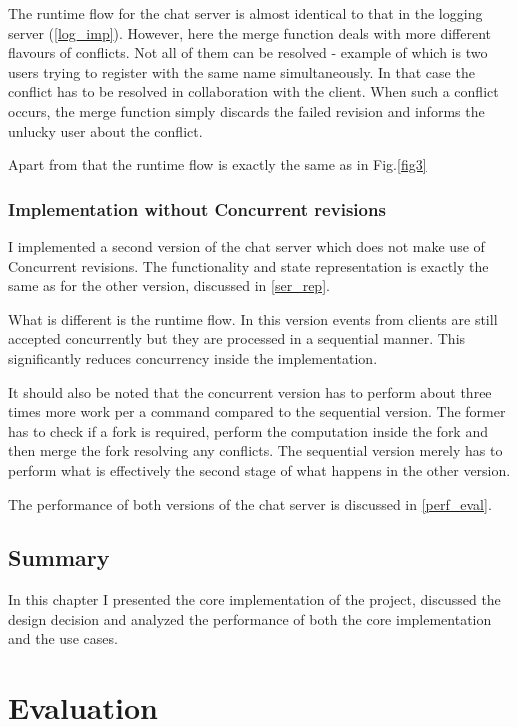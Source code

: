 \documentclass[12pt,twoside,notitlepage]{report}
\begin{document}
{The runtime flow for the chat server is almost identical to that in the logging server (\ref{log_imp}). However, here the merge function deals with more different flavours of conflicts. Not all of them can be resolved - example of which is two users trying to register with the same name simultaneously. In that case the conflict has to be resolved in collaboration with the client. When such a conflict occurs, the merge function simply discards the failed revision and informs the unlucky user about the conflict. 

Apart from that the runtime flow is exactly the same as in Fig.\ref{fig3}

\subsection{Implementation without Concurrent revisions}
\label{imp_no}
I implemented a second version of the chat server which does not make use of Concurrent revisions. The functionality and state representation is exactly the same as for the other version, discussed in \ref{ser_rep}. 

What is different is the runtime flow. In this version events from clients are still accepted concurrently but they are processed in a sequential manner. This significantly reduces concurrency inside the implementation. 

It should also be noted that the concurrent version has to perform about three times more work per a command compared to the sequential version. The former has to check if a fork is required, perform the computation inside the fork and then merge the fork resolving any conflicts. The sequential version merely has to perform what is effectively the second stage of what happens in the other version.

The performance of both versions of the chat server is discussed in \ref{perf_eval}.

\section{Summary}
In this chapter I presented the core implementation of the project, discussed the design decision and analyzed the performance of both the core implementation and the use cases.

\cleardoublepage
\chapter{Evaluation}

}
\end{document}
